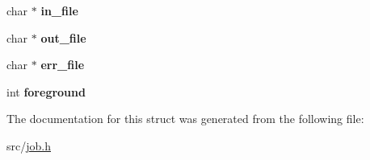 \begin{DoxyCompactItemize}
\item 
\hypertarget{struct__job_a9ee86359ab07771be609532e907b8eb3}{char $\ast$ {\bfseries in\-\_\-file}}\label{struct__job_a9ee86359ab07771be609532e907b8eb3}

\item 
\hypertarget{struct__job_a63d25ff1e6a28380db8d7f732e894a55}{char $\ast$ {\bfseries out\-\_\-file}}\label{struct__job_a63d25ff1e6a28380db8d7f732e894a55}

\item 
\hypertarget{struct__job_ab1f1d871ff9d3892c4cef64d4bc5e8dd}{char $\ast$ {\bfseries err\-\_\-file}}\label{struct__job_ab1f1d871ff9d3892c4cef64d4bc5e8dd}

\item 
\hypertarget{struct__job_abdbdc42c7781216c1dd62f5ada0bc217}{int {\bfseries foreground}}\label{struct__job_abdbdc42c7781216c1dd62f5ada0bc217}

\end{DoxyCompactItemize}


The documentation for this struct was generated from the following file\-:\begin{DoxyCompactItemize}
\item 
src/\hyperlink{job_8h}{job.\-h}\end{DoxyCompactItemize}
